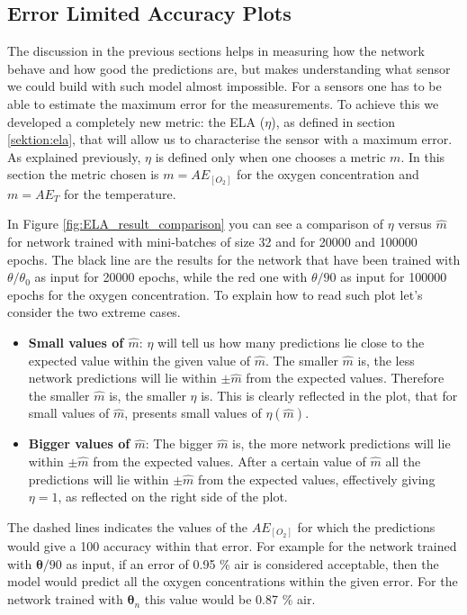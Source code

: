 \documentclass[9pt,twocolumn,twoside,pdftex]{optica}
\begin{document}
\subsection{Error Limited Accuracy Plots}

The discussion in the previous sections helps in measuring how the network behave and how good the predictions are, but makes understanding what sensor we could build with such model almost impossible. For a sensors one has to be able to estimate the maximum error for the measurements. To achieve this we developed a completely new metric: the ELA ($\eta$), as defined in section \ref{sektion:ela}, that will allow us to characterise the sensor with a maximum error. As explained previously, $\eta$ is defined only when one chooses a metric $m$. In this section the metric chosen is $m=AE_{[O_2]}$ for the oxygen concentration and $m=AE_{T}$ for the temperature.

In Figure \ref{fig:ELA_result_comparison} you can see a comparison of $\eta$ versus $\hat m$ for network trained with mini-batches of size 32 and for 20000 and 100000 epochs. The black line are the results for the network that have been trained with $\theta/\theta_0$ as input for 20000 epochs, while the red one with $\theta/90$ as input for 100000 epochs for the oxygen concentration.
To explain how to read such plot let's consider the two extreme cases. 
\begin{itemize}
\item {\bf Small values of $\hat m$}: $\eta$ will tell us how many predictions lie close to the expected value within the given value of $\hat m$. The smaller $\hat m$ is, the less network predictions will lie within $\pm \hat m$ from the expected values. Therefore the smaller $\hat m$ is, the smaller $\eta$ is. This is clearly reflected in the plot, that for small values of $\hat m$, presents small values of $\eta(\hat m)$.
\item {\bf Bigger values of $\hat m$}: The bigger $\hat m$ is, the more network predictions will lie within $\pm \hat m$ from the expected values. After a certain value of $\hat m$ all the predictions will lie within $\pm \hat m$ from the expected values, effectively giving $\eta = 1$, as reflected on the right side of the plot. 
\end{itemize}

The dashed lines indicates the values of the $AE_{[O_2]}$ for which the predictions would give a 100 accuracy within that error. For example for the network trained with ${\pmb \theta} / 90$ as input, if an error of 0.95 \% air is considered acceptable, then the model would predict all the oxygen concentrations within the given error. For the network trained with ${\pmb \theta}_n$ this value would be 0.87 \% air. 
\end{document}
